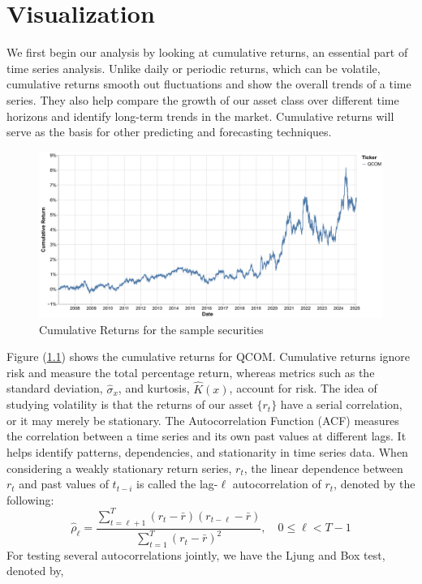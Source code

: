 \chapter{Visualization}
We first begin our analysis by looking at cumulative returns, an essential part of time series analysis. Unlike daily or periodic returns, which can be volatile, cumulative returns smooth out fluctuations and show the overall trends of a time series. They also help compare the growth of our asset class over different time horizons and identify long-term trends in the market. Cumulative returns will serve as the basis for other predicting and forecasting techniques.
\begin{figure}[h]
	\centering
	\includegraphics[width=0.9\linewidth]{content/plots/cumulative_returns_qcom}
	\caption{Cumulative Returns for the sample securities}
	\label{fig:cum_returns}
\end{figure}
Figure (\ref{fig:cum_returns}) shows the cumulative returns for QCOM. Cumulative returns ignore risk and measure the total percentage return, whereas metrics such as the standard deviation, $\hat{\sigma}_x$, and kurtosis, $\hat{K}(x)$, account for risk. The idea of studying volatility is that the returns of our asset $\lbrace r_t\rbrace$ have a serial correlation, or it may merely be stationary. The Autocorrelation Function (ACF) measures the correlation between a time series and its own past values at different lags. It helps identify patterns, dependencies, and stationarity in time series data. When considering a weakly stationary return series, $r_t$, the linear dependence between $r_t$ and past values of $t_{t-i}$ is called the lag-$\ell$ autocorrelation of $r_t$, denoted by the following:
\begin{equation}
	\hat{\rho}_\ell=\frac{\sum_{t=\ell+1}^{T}\left(r_t-\bar{r}\right)\left(r_{t-\ell}-\bar{r}\right)}{\sum_{t=1}^{T}\left(r_t-\bar{r}\right)^2},\quad 0\leq\ell<T-1
\end{equation}
For testing several autocorrelations jointly, we have the Ljung and Box test, denoted by,
